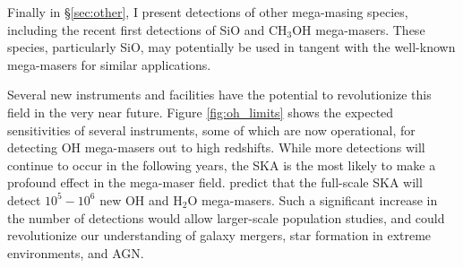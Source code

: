 Finally in \S\ref{sec:other}, I present detections of other mega-masing species, including the recent first detections of SiO and CH$_3$OH mega-masers. These species, particularly SiO, may potentially be used in tangent with the well-known mega-masers for similar applications.

Several new instruments and facilities have the potential to revolutionize this field in the very near future. Figure \ref{fig:oh_limits} shows the expected sensitivities of several instruments, some of which are now operational, for detecting OH mega-masers out to high redshifts. While more detections will continue to occur in the following years, the SKA is the most likely to make a profound effect in the mega-maser field. \citet{Morganti_2004} predict that the full-scale SKA will detect $10^5 - 10^6$ new OH and H$_2$O mega-masers. Such a significant increase in the number of detections would allow larger-scale population studies, and could revolutionize our understanding of galaxy mergers, star formation in extreme environments, and AGN.